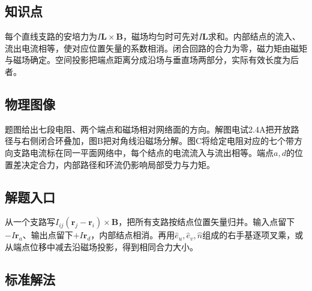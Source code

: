 \documentclass[UTF8,fontset=fandol,a4paper,11pt]{ctexart}
\begin{document}

\subsection*{知识点}

每个直线支路的安培力为$I\boldsymbol L\times\boldsymbol B$，磁场均匀时可先对$I\boldsymbol L$求和。内部结点的流入、流出电流相等，使对应位置矢量的系数相消。闭合回路的合力为零，磁力矩由磁矩与磁场确定。空间投影把端点距离分成沿场与垂直场两部分，实际有效长度为后者。



\subsection*{物理图像}

题图给出七段电阻、两个端点和磁场相对网络面的方向。解图电试2.4A把开放路径与右侧闭合环叠加，图B把对角线沿磁场分解。图C将给定电阻对应的七个带方向支路电流标在同一平面网络中，每个结点的电流流入与流出相等。端点$a,d$的位置差决定合力，内部路径和环流仍影响局部受力与力矩。



\subsection*{解题入口}

从一个支路写$I_{ij}(\boldsymbol r_j-\boldsymbol r_i)\times\boldsymbol B$，把所有支路按结点位置矢量归并。输入点留下$-I\boldsymbol r_a$、输出点留下$+I\boldsymbol r_d$，内部结点相消。再用$\hat e_u,\hat e_v,\hat n$组成的右手基逐项叉乘，或从端点位移中减去沿磁场投影，得到相同合力大小。



\subsection*{标准解法}
\end{document}
